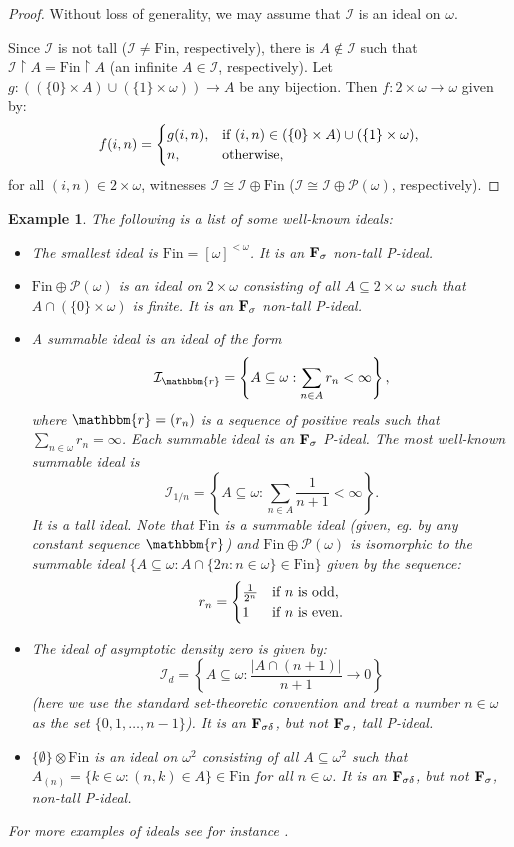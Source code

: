 \documentclass[10pt,a4paper]{amsart}
\newcommand{\I}{\mathcal{I}}
\newcommand{\Fin}{\mathrm{Fin}}
\newcommand{\w}{\mathbbm}
\newtheorem{example}[theorem]{Example}
\begin{document}
\begin{proof}
Without loss of generality, we may assume that $\I$ is an ideal on $\omega$. 

Since $\I$ is not tall ($\I\neq\Fin$, respectively), there is $A\notin\I$ such that $\I\restriction A=\Fin\restriction A$ (an infinite $A\in\I$, respectively). Let $g:((\{0\}\times A)\cup(\{1\}\times\omega))\to A$ be any bijection. Then $f:2\times\omega\to\omega$ given by:
\[
f(i,n)=\begin{cases}
    g(i,n), & \text{if }(i,n)\in(\{0\}\times A)\cup(\{1\}\times\omega),\cr
    n, & \text{otherwise,}
\end{cases}
\]
for all $(i,n)\in 2\times\omega$, witnesses $\I\cong\I\oplus\Fin$ ($\I\cong\I\oplus\mathcal{P}(\omega)$, respectively).
\end{proof}

\begin{example}
The following is a list of some well-known ideals:
\begin{itemize}
    \item The smallest ideal is $\Fin=[\omega]^{<\omega}$.  It is an $\bf{F_\sigma}$ non-tall P-ideal.
    \item $\Fin\oplus\mathcal{P}(\omega)$ is an ideal on $2\times\omega$ consisting of all $A\subseteq 2\times\omega$ such that $A\cap(\{0\}\times\omega)$ is finite. It is an $\bf{F_\sigma}$ non-tall P-ideal. 
    \item A summable ideal is an ideal of the form
\[
\I_{\w{r}}=\left\{A\subseteq\omega:\sum_{n\in A}r_n<\infty\right\},
\]
where $\w{r}=(r_n)$ is a sequence of positive reals such that $\sum_{n\in\omega}r_n=\infty$. Each summable ideal is an $\bf{F_\sigma}$ P-ideal. The most well-known summable ideal is
\[
\I_{1/n}=\left\{A\subseteq\omega:\sum_{n\in A}\frac{1}{n+1}<\infty\right\}.
\]
It is a tall ideal. Note that $\Fin$ is a summable ideal (given, eg. by any constant sequence $\w{r}$) and $\Fin\oplus\mathcal{P}(\omega)$ is isomorphic to the summable ideal $\{A\subseteq\omega: A\cap\{2n:n\in\omega\}\in\Fin\}$ given by the sequence:
\[
r_n=\begin{cases}
    \frac{1}{2^n} & \text{if }n\text{ is odd},\cr
    1 & \text{if }n\text{ is even}.
\end{cases}
\]
\item The ideal of asymptotic density zero is given by:
\[
\I_d= \left\{A \subseteq \omega: \frac{|A \cap (n+1)|}{n+1} \to 0 \right\}
\]
(here we use the standard set-theoretic convention and treat a number $n\in\omega$ as the set $\{0,1,\ldots,n-1\}$). It is an $\bf{F_{\sigma\delta}}$, but not $\bf{F_{\sigma}}$, tall P-ideal. 
\item $\{\emptyset\}\otimes\Fin$ is an ideal on $\omega^2$ consisting of all $A\subseteq\omega^2$ such that $A_{(n)}=\{k\in\omega: (n,k)\in A\}\in\Fin$ for all $n\in\omega$.  It is an $\bf{F_{\sigma\delta}}$, but not $\bf{F_{\sigma}}$, non-tall P-ideal. 
\end{itemize}
For more examples of ideals see for instance \cite{Farah}.
\end{example}
\end{document}
